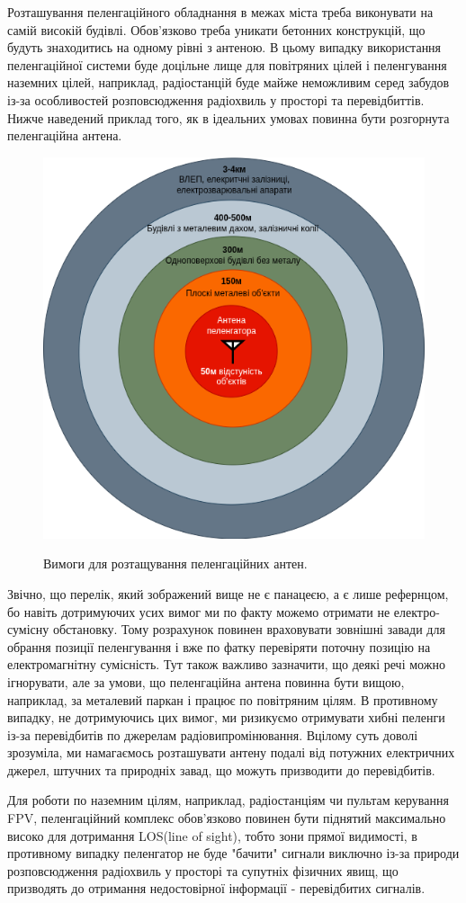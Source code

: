 \documentclass{article}
\begin{document}
Розташування пеленгаційного обладнання в межах міста треба виконувати на самій високій будівлі. Обов'язково треба уникати бетонних конструкцій, що будуть знаходитись на одному рівні з антеною. В цьому випадку використання пеленгаційної системи буде доцільне лище для повітряних цілей і пеленгування наземних цілей, наприклад, радіостанцій буде майже неможливим серед забудов із-за особливостей розповсюдження радіохвиль у просторі та перевідбиттів. Нижче наведений приклад того, як в ідеальних умовах повинна бути розгорнута пеленгаційна антена.

\begin{figure}[H]
	\centering
	{\includegraphics[width=0.5\linewidth]{images/obstacles_for_df_antenna.png}}
	\caption{\label{fig:triangulations} Вимоги для розтащування пеленгаційних антен.}
\end{figure}

Звічно, що перелік, який зображений вище не є панацеєю, а є лише рефернцом, бо навіть дотримуючих усих вимог ми по факту можемо отримати не електро-сумісну обстановку. Тому розрахунок повинен враховувати зовнішні завади для обрання позиції пеленгування і вже по фатку перевіряти поточну позицію на електромагнітну сумісність. Тут також важливо зазначити, що деякі речі можно ігнорувати, але за умови, що пеленгаційна антена повинна бути вищою, наприклад, за металевий паркан і працює по повітряним цілям. В противному випадку, не дотримуючись цих вимог, ми ризикуємо отримувати хибні пеленги із-за перевідбитів по джерелам радіовипромінювання. Вцілому суть доволі зрозуміла, ми намагаємось розташувати антену подалі від потужних електричних джерел, штучних та природніх завад, що можуть призводити до перевідбитів. 

Для роботи по наземним цілям, наприклад, радіостанціям чи пультам керування FPV, пеленгаційний комплекс обов'язково повинен бути піднятий максимально високо для дотримання LOS(line of sight), тобто зони прямої видимості, в противному випадку пеленгатор не буде "бачити" сигнали виключно із-за природи розповсюдження радіохвиль у просторі та супутніх фізичних явищ, що призводять до отримання недостовірної інформації - перевідбитих сигналів.
\end{document}
